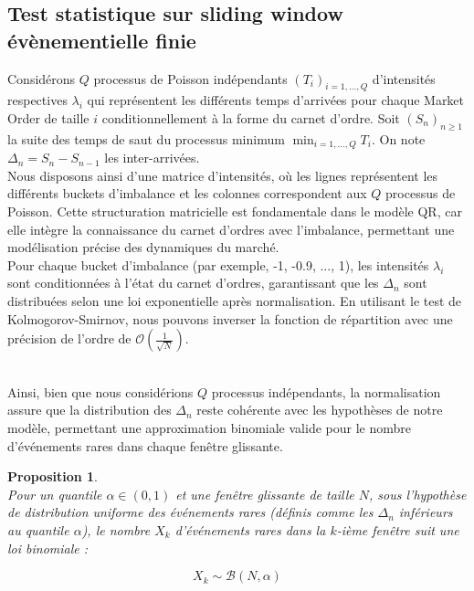 \documentclass[12pt,a4paper]{article}
\newtheorem{proposition}[theorem]{Proposition}
\theoremstyle{definition}
\theoremstyle{remark}
\begin{document}
\newpage 
\subsection*{Test statistique sur sliding window évènementielle finie}

    Considérons $Q$ processus de Poisson indépendants $(T_i)_{i=1,\ldots,Q}$ d'intensités respectives $\lambda_i$ qui représentent les différents temps d'arrivées pour chaque Market Order de taille $i$ conditionnellement à la forme du carnet d'ordre. Soit $(S_n)_{n\geq 1}$ la suite des temps de saut du processus minimum $\min_{i=1,\ldots,Q} T_i$. On note $\Delta_n = S_n - S_{n-1}$ les inter-arrivées.
\\

Nous disposons ainsi d'une matrice d'intensités, où les lignes représentent les différents buckets d'imbalance et les colonnes correspondent aux $Q$ processus de Poisson. Cette structuration matricielle est fondamentale dans le modèle QR, car elle intègre la connaissance du carnet d'ordres avec l'imbalance, permettant une modélisation précise des dynamiques du marché.
\\

    Pour chaque bucket d'imbalance (par exemple, -1, -0.9, ..., 1), les intensités $\lambda_i$ sont conditionnées à l'état du carnet d'ordres, garantissant que les $\Delta_n$ sont distribuées selon une loi exponentielle après normalisation. En utilisant le test de Kolmogorov-Smirnov, nous pouvons inverser la fonction de répartition avec une précision de l'ordre de $\mathcal{O}\left(\frac{1}{\sqrt{N}}\right)$.

\\

    Ainsi, bien que nous considérions $Q$ processus indépendants, la normalisation assure que la distribution des $\Delta_n$ reste cohérente avec les hypothèses de notre modèle, permettant une approximation binomiale valide pour le nombre d'événements rares dans chaque fenêtre glissante.
    \\
    
    \begin{proposition}
    \\
    
    Pour un quantile $\alpha \in (0,1)$ et une fenêtre glissante de taille $N$, sous l'hypothèse de distribution uniforme des événements rares (définis comme les $\Delta_n$ inférieurs au quantile $\alpha$), le nombre $X_k$ d'événements rares dans la $k$-ième fenêtre suit une loi binomiale :

    \[
    X_k \sim \mathcal{B}(N, \alpha)
    \]
    \end{proposition}
\end{document}
